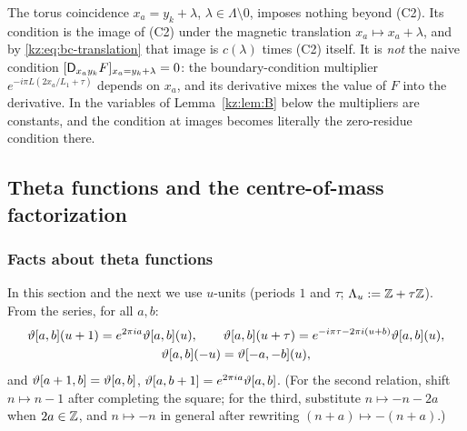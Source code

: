 \begin{remark}\label{kz:rem:images}
The torus coincidence $x_a=y_k+\lambda$, $\lambda\in\Lambda\setminus0$, imposes nothing beyond (C2). Its
condition is the image of (C2) under the magnetic translation $x_a\mapsto x_a+\lambda$, and by
\eqref{kz:eq:bc-translation} that image is $c(\lambda)$ times (C2) itself. It is \emph{not} the naive
condition $[\mathsf{D}_{x_ay_k}F]_{x_a=y_k+\lambda}=0$: the boundary-condition multiplier
$e^{-i\pi L(2x_a/L_1+\tau)}$ depends on $x_a$, and its derivative mixes the value of $F$ into the
derivative. In the variables of Lemma~\ref{kz:lem:B} below
the multipliers are constants, and the condition at images becomes literally the zero-residue condition
there.
\end{remark}

\subsection{Theta functions and the centre-of-mass factorization}\label{kz:sec:B}

\subsubsection{Facts about theta functions}

In this section and the next we use $u$-units (periods $1$ and $\tau$; $\Lambda_u:=\mathbb{Z}+\tau\mathbb{Z}$). From the
series, for all $a,b$:
\begin{equation}\label{kz:eq:theta-basic}
\begin{gathered}
\vartheta[a,b](u+1)=e^{2\pi ia}\vartheta[a,b](u),\qquad \vartheta[a,b](u+\tau)=e^{-i\pi\tau-2\pi i(u+b)}\vartheta[a,b](u),\\
\vartheta[a,b](-u)=\vartheta[-a,-b](u),
\end{gathered}
\end{equation}
and $\vartheta[a+1,b]=\vartheta[a,b]$, $\vartheta[a,b+1]=e^{2\pi ia}\vartheta[a,b]$. (For the second relation, shift $n\mapsto n-1$
after completing the square; for the third, substitute $n\mapsto-n-2a$ when $2a\in\mathbb{Z}$, and $n\mapsto-n$ in general
after rewriting $(n+a)\mapsto-(n+a)$.)

